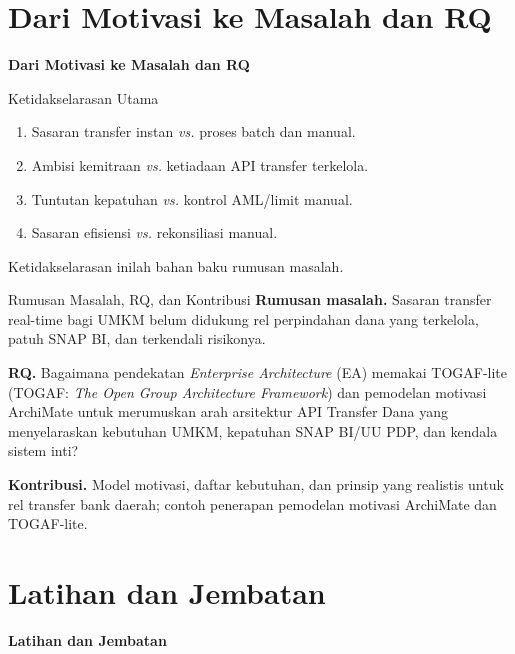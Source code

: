 \documentclass[aspectratio=169, table]{beamer}
\newcommand{\sectionframe}[1]{%
  \begin{frame}{\hfill}
    \centering
    \Huge{\textbf{#1}}
  \end{frame}
}
\newcommand{\takeaway}[1]{%
  \vspace{4pt}
  {\footnotesize #1}
}
\begin{document}
\section{Dari Motivasi ke Masalah dan RQ}
\sectionframe{Dari Motivasi ke Masalah dan RQ}

\begin{frame}{Ketidakselarasan Utama}
  \vspace{8pt}
  \begin{enumerate}
    \item Sasaran transfer instan \emph{vs.} proses batch dan manual.
    \item Ambisi kemitraan \emph{vs.} ketiadaan API transfer terkelola.
    \item Tuntutan kepatuhan \emph{vs.} kontrol AML/limit manual.
    \item Sasaran efisiensi \emph{vs.} rekonsiliasi manual.
  \end{enumerate}
  \takeaway{Ketidakselarasan inilah bahan baku rumusan masalah.}
\end{frame}

\begin{frame}{Rumusan Masalah, RQ, dan Kontribusi}
  \vspace{4pt}
  \footnotesize
  \textbf{Rumusan masalah.} Sasaran transfer real-time bagi UMKM belum didukung
  rel perpindahan dana yang terkelola, patuh SNAP BI, dan terkendali risikonya.

  \vspace{4pt}
  \textbf{RQ.} Bagaimana pendekatan \emph{Enterprise Architecture} (EA) memakai
  TOGAF-lite (TOGAF: \emph{The Open Group Architecture Framework}) dan pemodelan
  motivasi ArchiMate untuk merumuskan arah arsitektur API Transfer Dana yang
  menyelaraskan kebutuhan UMKM, kepatuhan SNAP BI/UU PDP, dan kendala sistem
  inti?

  \vspace{4pt}
  \textbf{Kontribusi.} Model motivasi, daftar kebutuhan, dan prinsip yang
  realistis untuk rel transfer bank daerah; contoh penerapan pemodelan motivasi
  ArchiMate dan TOGAF-lite.
\end{frame}

\section{Latihan dan Jembatan}
\sectionframe{Latihan dan Jembatan}
\end{document}
